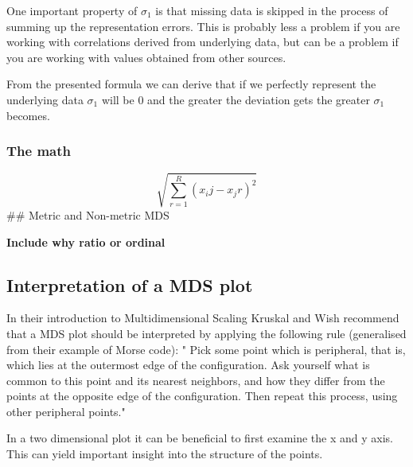 \documentclass[]{article}
\begin{document}
One important property of \(\sigma_1\) is that missing data is skipped
in the process of summing up the representation errors. This is probably
less a problem if you are working with correlations derived from
underlying data, but can be a problem if you are working with values
obtained from other sources.

From the presented formula we can derive that if we perfectly represent
the underlying data \(\sigma_1\) will be 0 and the greater the deviation
gets the greater \(\sigma_1\) becomes.

\subsubsection{The math}\label{the-math}

\[\sqrt{\sum_{r=1}^{R} (x_ij - x_jr)^2}\] \#\# Metric and Non-metric MDS

\textbf{Include why ratio or ordinal}

\subsection{Interpretation of a MDS
plot}\label{interpretation-of-a-mds-plot}

In their introduction to Multidimensional Scaling Kruskal and Wish
recommend that a MDS plot should be interpreted by applying the
following rule (generalised from their example of Morse code): " Pick
some point which is peripheral, that is, which lies at the outermost
edge of the configuration. Ask yourself what is common to this point and
its nearest neighbors, and how they differ from the points at the
opposite edge of the configuration. Then repeat this process, using
other peripheral points."

In a two dimensional plot it can be beneficial to first examine the x
and y axis. This can yield important insight into the structure of the
points.
\end{document}
